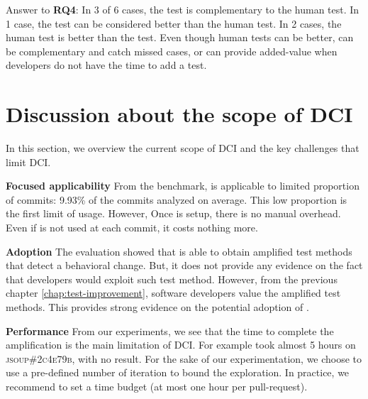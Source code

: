 \begin{mdframed}
Answer to \textbf{RQ4}: 
In 3 of 6 cases, the \DCI test is complementary to the human test.
In 1 case, the \DCI test can be considered better than the human test.
In 2 cases, the human test is better than the \DCI test.
Even though human tests can be better, \DCI can be complementary and catch missed cases, or can provide added-value when developers do not have the time to add a test.
\end{mdframed}



\section{Discussion about the scope of DCI}
\label{sec:limitation}

In this section, we overview the current scope of DCI and the key challenges that limit DCI.

\textbf{Focused applicability}
From the benchmark, \DCI is applicable to limited proportion of commits: 9.93\% of the commits analyzed  on average.
This low proportion is the first limit of \DCI usage.
However, Once \DCI is setup, there is no manual overhead.
Even if \DCI is not used at each commit, it costs nothing more.

\textbf{Adoption}
The evaluation showed that \DCI is able to obtain amplified test methods that detect a behavioral change.
But, it does not provide any evidence on the fact that developers would exploit such test method.
However, from the previous chapter \autoref{chap:test-improvement}, software developers value the amplified test methods.
This provides strong evidence on the potential adoption of \DCI.

\textbf{Performance}
From our experiments, we see that the time  to complete the amplification is the main limitation of DCI. For example \DCI took almost 5 hours on
\textsc{jsoup\#2c4e79b},  with no result.
For the sake of our experimentation, we choose to use a pre-defined number of iteration to bound the exploration.
In practice, we recommend to set a time budget (\eg at most one hour per pull-request).

